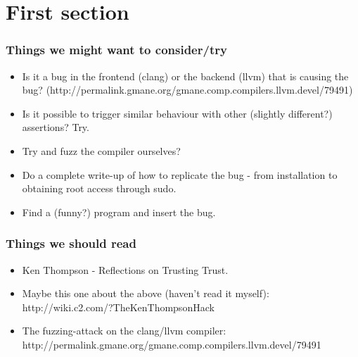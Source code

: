\section{First section}

\begin{frame}
  \frametitle{Things we might want to consider/try}
%
\begin{itemize}
  \item Is it a bug in the frontend (clang) or the backend
    (llvm) that is causing the bug?
    (http://permalink.gmane.org/gmane.comp.compilers.llvm.devel/79491)
  \item Is it possible to trigger similar behaviour with
    other (slightly different?) assertions? Try.
  \item Try and fuzz the compiler ourselves?
  \item Do a complete write-up of how to replicate the bug -
    from installation to obtaining root access through sudo.
  \item Find a (funny?) program and insert the bug.
\end{itemize}
%
\end{frame}



\begin{frame}
  \frametitle{Things we should read}
%
\begin{itemize}
  \item Ken Thompson - Reflections on Trusting Trust.
  \item Maybe this one about the above (haven't read it
    myself): http://wiki.c2.com/?TheKenThompsonHack
  \item The fuzzing-attack on the clang/llvm compiler:
    http://permalink.gmane.org/gmane.comp.compilers.llvm.devel/79491
\end{itemize}
\end{frame}



